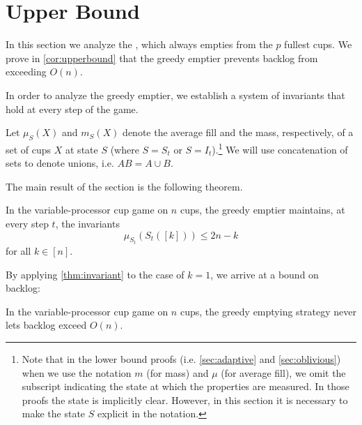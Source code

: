 \section{Upper Bound}\label{sec:upperBound}

In this section we analyze the , which always empties
from the $p$ fullest cups. We prove in \cref{cor:upperbound} that the
greedy emptier prevents backlog from exceeding $O(n)$. 

In order to analyze the greedy emptier, we establish a system of invariants
that hold at every step of the game. 

Let $\mu_S(X)$ and $m_S(X)$ denote the average fill and the mass, respectively,
of a set of cups $X$ at state $S$ (where $S=S_t$ or $S=I_t$).\footnote{Note that
in the lower bound proofs (i.e. \cref{sec:adaptive} and 
\cref{sec:oblivious}) when we use the notation $m$ (for mass) and $\mu$ (for
average fill), we omit the subscript indicating the state at which the
properties are measured. In those proofs the state is implicitly clear.
However, in this section it is necessary to make the state $S$ explicit in
the notation.} We will use concatenation of sets to
denote unions, i.e. $AB = A\cup B$. 

The main result of the section is the following theorem.  
\begin{theorem}
  \label{thm:invariant}
  In the variable-processor cup game on $n$ cups, the greedy
  emptier maintains, at every step $t$,
  the invariants
  \begin{equation}
    \label{eq:invariants}
      \mu_{S_t}(S_t([k])) \le 2n-k
  \end{equation}
  for all  $k \in [n]$.
\end{theorem}

By applying \cref{thm:invariant} to the case of $k = 1$, we arrive at a bound on backlog:
\begin{corollary}
  In the variable-processor cup game on $n$ cups, the greedy
  emptying strategy never lets backlog exceed $O(n)$.
  \label{cor:upperbound}
\end{corollary}

